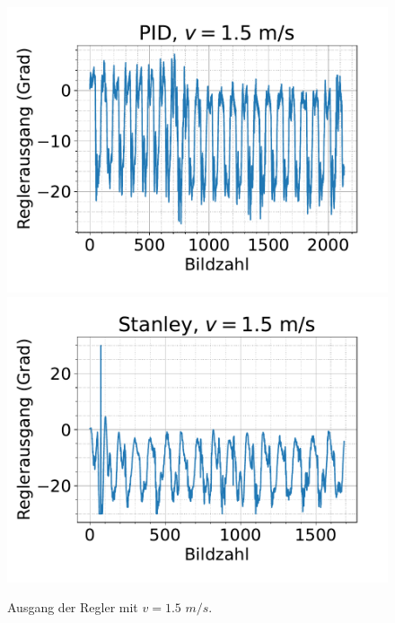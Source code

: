 \documentclass[arbeit=studie,oneside,BCOR=12mm]{ArbeitRST}
\begin{document}
\begin{figure}[h]
    \centering
    \includegraphics[scale=0.47]{pid1.5}
    \includegraphics[scale=0.47]{Stan1.5}
    \caption{Ausgang der Regler mit $v = 1.5$ $m/s$.}
    \label{reg:1.5}
\end{figure}
\end{document}
